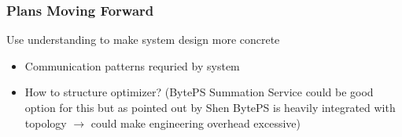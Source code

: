   \begin{frame}
    \frametitle{Plans Moving Forward}

    Use understanding to make system design more concrete
    \begin{itemize}
      \item Communication patterns requried by system
      \item How to structure optimizer? (BytePS Summation Service could be good
            option for this but as pointed out by Shen BytePS is heavily integrated
            with topology $\rightarrow$ could make engineering overhead excessive)
    \end{itemize}
  \end{frame}


